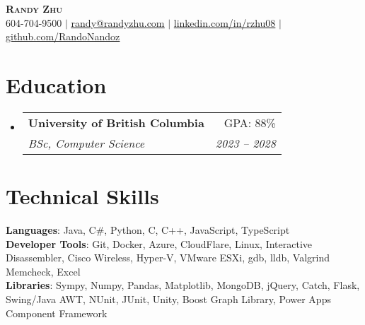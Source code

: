 \documentclass[letterpaper,11pt]{article}
\makeatletter
\newcommand{\resumeSubheading}[4]{
  \vspace{-2pt}\item
    \begin{tabular*}{0.97\textwidth}[t]{l@{\extracolsep{\fill}}r}
      \textbf{#1} & #2 \\
      \textit{\small#3} & \textit{\small #4} \\
    \end{tabular*}\vspace{-7pt}
}
\newcommand{\resumeSubHeadingListStart}{\begin{itemize}[leftmargin=0.15in, label={}]}
\newcommand{\resumeSubHeadingListEnd}{\end{itemize}}
\makeatother
\begin{document}

\begin{center}
  \textbf{\Huge \scshape Randy Zhu} \\ \vspace{1pt}
  \small 604-704-9500 $|$ \href{mailto:randyzhu@student.ubc.ca}{\underline{randy@randyzhu.com}} $|$
  \href{https://www.linkedin.com/in/rzhu08/}{{linkedin.com/in/rzhu08}} $|$
  \href{https://github.com/RandoNandoz}{\underline{github.com/RandoNandoz}}
\end{center}

\section{Education}
\resumeSubHeadingListStart
\resumeSubheading
{University of British Columbia}{GPA: 88\%}
{BSc, Computer Science}{2023 -- 2028}
\resumeSubHeadingListEnd

%
\section{Technical Skills}
\begin{itemize}[leftmargin=0.15in, label={}]
  \small{\item{
        \textbf{Languages}{: Java, C\#, Python, C, C++, JavaScript, TypeScript} \\
        \textbf{Developer Tools}{: Git, Docker, Azure, CloudFlare, Linux, Interactive Disassembler, Cisco Wireless, Hyper-V, VMware ESXi, gdb, lldb, Valgrind Memcheck, Excel} \\
        \textbf{Libraries}{: Sympy, Numpy, Pandas, Matplotlib, MongoDB, jQuery, Catch, Flask, Swing/Java AWT, NUnit, JUnit, Unity, Boost Graph Library, Power Apps Component Framework}}}
\end{itemize}


\end{document}
